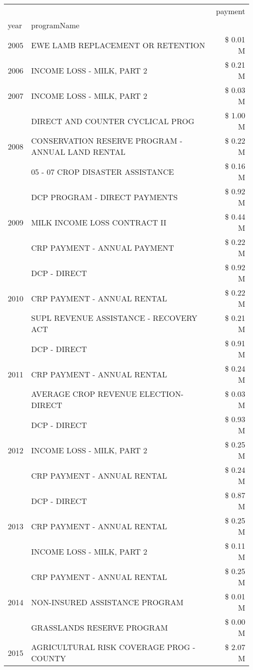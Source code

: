 \begin{tabular}{llr}
\toprule
 &  & payment \\
year & programName &  \\
\midrule
2005 & EWE LAMB REPLACEMENT OR RETENTION & \$ 0.01 M \\
\cline{1-3}
2006 & INCOME LOSS - MILK, PART 2 & \$ 0.21 M \\
\cline{1-3}
2007 & INCOME LOSS - MILK, PART 2 & \$ 0.03 M \\
\cline{1-3}
\multirow[t]{3}{*}{2008} & DIRECT AND COUNTER CYCLICAL PROG & \$ 1.00 M \\
 & CONSERVATION RESERVE PROGRAM - ANNUAL LAND RENTAL & \$ 0.22 M \\
 & 05 - 07 CROP DISASTER ASSISTANCE & \$ 0.16 M \\
\cline{1-3}
\multirow[t]{3}{*}{2009} & DCP PROGRAM - DIRECT PAYMENTS & \$ 0.92 M \\
 & MILK INCOME LOSS CONTRACT II & \$ 0.44 M \\
 & CRP PAYMENT - ANNUAL PAYMENT & \$ 0.22 M \\
\cline{1-3}
\multirow[t]{3}{*}{2010} & DCP - DIRECT & \$ 0.92 M \\
 & CRP PAYMENT - ANNUAL RENTAL & \$ 0.22 M \\
 & SUPL REVENUE ASSISTANCE - RECOVERY ACT & \$ 0.21 M \\
\cline{1-3}
\multirow[t]{3}{*}{2011} & DCP - DIRECT & \$ 0.91 M \\
 & CRP PAYMENT - ANNUAL RENTAL & \$ 0.24 M \\
 & AVERAGE CROP REVENUE ELECTION-DIRECT & \$ 0.03 M \\
\cline{1-3}
\multirow[t]{3}{*}{2012} & DCP - DIRECT & \$ 0.93 M \\
 & INCOME LOSS - MILK, PART 2 & \$ 0.25 M \\
 & CRP PAYMENT - ANNUAL RENTAL & \$ 0.24 M \\
\cline{1-3}
\multirow[t]{3}{*}{2013} & DCP - DIRECT & \$ 0.87 M \\
 & CRP PAYMENT - ANNUAL RENTAL & \$ 0.25 M \\
 & INCOME LOSS - MILK, PART 2 & \$ 0.11 M \\
\cline{1-3}
\multirow[t]{3}{*}{2014} & CRP PAYMENT - ANNUAL RENTAL & \$ 0.25 M \\
 & NON-INSURED ASSISTANCE PROGRAM & \$ 0.01 M \\
 & GRASSLANDS RESERVE PROGRAM & \$ 0.00 M \\
\cline{1-3}
\multirow[t]{3}{*}{2015} & AGRICULTURAL RISK COVERAGE PROG - COUNTY & \$ 2.07 M \\

\end{tabular}
